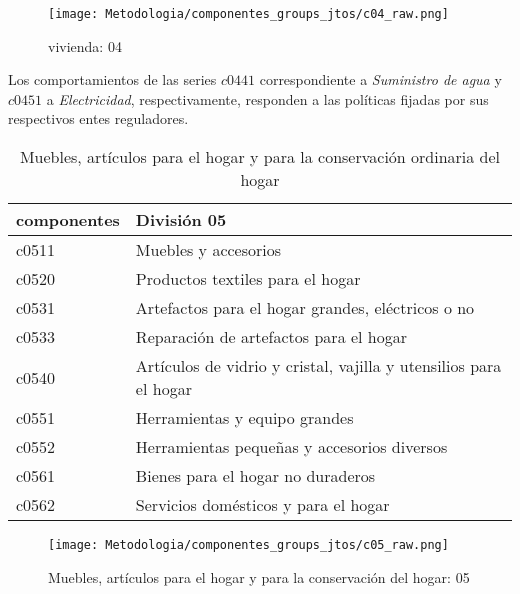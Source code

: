 \documentclass[12pt]{article}
\begin{document}
\begin{figure}[h!]
    \caption{vivienda: 04}
    \label{fig:c04_raw}
    \centering
    \texttt{[image: Metodologia/componentes\_groups\_jtos/c04\_raw.png]}
\end{figure}

Los comportamientos de las series $c0441$ correspondiente a \textit{Suministro de agua} y $c0451$ a \textit{Electricidad}, respectivamente, responden a las políticas fijadas por sus respectivos entes reguladores.



\clearpage

\begin{table}[h!]
\caption{Muebles, artículos para el hogar y para la conservación ordinaria del hogar}
\label{tab:compo_05}
\begin{tabular}{l m{10cm}}
\toprule
componentes & División 05 \\
\midrule
c0511 & Muebles y accesorios \\
c0520 & Productos textiles para el hogar \\
c0531 & Artefactos para el hogar grandes, eléctricos o no \\
c0533 & Reparación de artefactos para el hogar \\
c0540 & Artículos de vidrio y cristal, vajilla y utensilios para el hogar \\
c0551 & Herramientas y equipo grandes \\
c0552 & Herramientas pequeñas y accesorios diversos \\
c0561 & Bienes para el hogar no duraderos \\
c0562 & Servicios domésticos y para el hogar\\
\bottomrule
\end{tabular}
\end{table}

\begin{figure}[h!]
    \caption{Muebles, artículos para el hogar y para la conservación del hogar: 05}
    \label{fig:c05_raw}
    \centering
    \texttt{[image: Metodologia/componentes\_groups\_jtos/c05\_raw.png]}
\end{figure}


\clearpage
\end{document}
